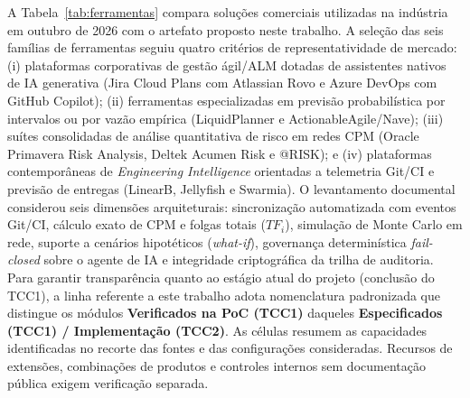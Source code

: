 \documentclass[12pt,openany,oneside,a4paper,english,brazilian,sumario=tradicional]{abntex2}
\begin{document}
A Tabela~\ref{tab:ferramentas} compara soluções comerciais utilizadas na indústria em outubro de 2026 com o artefato proposto neste trabalho. A seleção das seis famílias de ferramentas seguiu quatro critérios de representatividade de mercado: (i) plataformas corporativas de gestão ágil/ALM dotadas de assistentes nativos de IA generativa (Jira Cloud Plans com Atlassian Rovo e Azure DevOps com GitHub Copilot); (ii) ferramentas especializadas em previsão probabilística por intervalos ou por vazão empírica (LiquidPlanner e Actionable\allowbreak Agile/Nave); (iii) suítes consolidadas de análise quantitativa de risco em redes CPM (Oracle Primavera Risk Analysis, Deltek Acumen Risk e @RISK); e (iv) plataformas contemporâneas de \textit{Engineering Intelligence} orientadas a telemetria Git/CI e previsão de entregas (LinearB, Jellyfish e Swarmia). O levantamento documental considerou seis dimensões arquiteturais: sincronização automatizada com eventos Git/CI, cálculo exato de CPM e folgas totais ($TF_i$), simulação de Monte Carlo em rede, suporte a cenários hipotéticos (\textit{what-if}), governança determinística \textit{fail-closed} sobre o agente de IA e integridade criptográfica da trilha de auditoria. Para garantir transparência quanto ao estágio atual do projeto (conclusão do TCC1), a linha referente a este trabalho adota nomenclatura padronizada que distingue os módulos \textbf{Verificados na PoC (TCC1)} daqueles \textbf{Especificados (TCC1) / Implementação (TCC2)}. As células resumem as capacidades identificadas no recorte das fontes e das configurações consideradas. Recursos de extensões, combinações de produtos e controles internos sem documentação pública exigem verificação separada.
\end{document}
